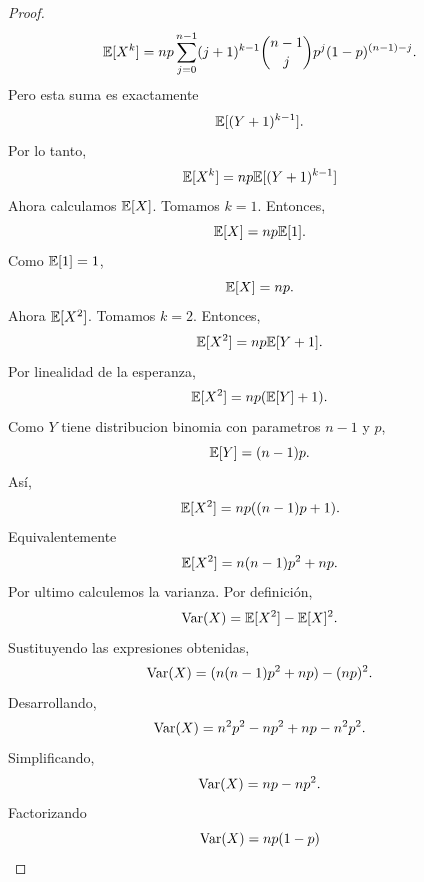 \documentclass[12pt,a4paper]{article}
\begin{document}
\begin{proof}
\begin{equation*}
            \mathbb{E}[X^{k}]=np\sum_{j=0}^{n-1}(j+1)^{k-1}\binom{n-1}{j}p^{j}(1-p)^{(n-1)-j}.
        \end{equation*}
        Pero esta suma es exactamente
        \begin{equation*}
            \mathbb{E}[(Y+1)^{k-1}].
        \end{equation*}
        Por lo tanto,
        \begin{equation*}
            \mathbb{E}[X^{k}]=np\mathbb{E}[(Y+1)^{k-1}]
        \end{equation*}
        Ahora calculamos $\mathbb{E}[X]$. Tomamos $k=1$. Entonces,
        \begin{equation*}
            \mathbb{E}[X]=np\mathbb{E}[1].
        \end{equation*}
        Como $\mathbb{E}[1]=1$,
        \begin{equation*}
            \mathbb{E}[X]=np.
        \end{equation*}
        Ahora $\mathbb{E}[X^{2}]$. Tomamos $k=2$. Entonces,
        \begin{equation*}
            \mathbb{E}[X^{2}]=np\mathbb{E}[Y+1].
        \end{equation*}
        Por linealidad de la esperanza,
        \begin{equation*}
            \mathbb{E}[X^{2}]=np(\mathbb{E}[Y]+1).
        \end{equation*}
        Como $Y$ tiene distribucion binomia con parametros $n-1$ y $p$,
        \begin{equation*}
            \mathbb{E}[Y]=(n-1)p.
        \end{equation*}
        Así,
        \begin{equation*}
            \mathbb{E}[X^{2}]=np((n-1)p+1).
        \end{equation*}
        Equivalentemente
        \begin{equation*}
            \mathbb{E}[X^{2}]=n(n-1)p^{2}+np.
        \end{equation*}
        Por ultimo calculemos la varianza. Por definición,
        \begin{equation*}
            \operatorname{Var}(X)=\mathbb{E}[X^{2}]-\mathbb{E}[X]^{2}.
        \end{equation*}
        Sustituyendo las expresiones obtenidas,
        \begin{equation*}
            \operatorname{Var}(X)=(n(n-1)p^{2}+np)-(np)^{2}.
        \end{equation*}
        Desarrollando,
        \begin{equation*}
            \operatorname{Var}(X)=n^{2}p^{2}-np^{2}+np-n^{2}p^{2}.
        \end{equation*}
        Simplificando,
        \begin{equation*}
            \operatorname{Var}(X)=np-np^{2}.
        \end{equation*}
        Factorizando
        \begin{equation*}
            \operatorname{Var}(X)=np(1-p)
        \end{equation*}
    \end{proof}
\end{document}
